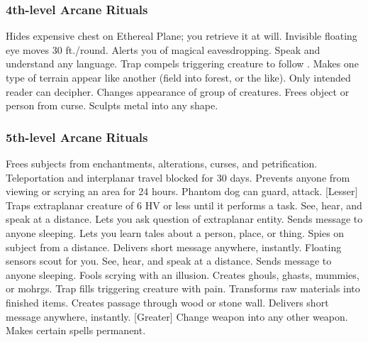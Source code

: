\subsubsection{4th-level Arcane Rituals}
\begin{rituallist}
    \F Hides expensive chest on Ethereal Plane; you retrieve it at will.
     Invisible floating eye moves 30 ft./round.
     Alerts you of magical eavesdropping.
     Speak and understand any language.
     Trap compels triggering creature to follow .
     Makes one type of terrain appear like another (field into forest, or the like).
     Only intended reader can decipher.
     Changes appearance of group of creatures.
     Frees object or person from curse.
     Sculpts metal into any shape.
\end{rituallist}

\subsubsection{5th-level Arcane Rituals}
\begin{rituallist}
     Frees subjects from enchantments, alterations, curses, and petrification.
     Teleportation and interplanar travel blocked for 30 days.
     Prevents anyone from viewing or scrying an area for 24 hours.
     Phantom dog can guard, attack.
    [Lesser] Traps extraplanar creature of 6 HV or less until it performs a task.
     See, hear, and speak at a distance.
     Lets you ask question of extraplanar entity.
     Sends message to anyone sleeping.
    \F Lets you learn tales about a person, place, or thing.
    \F Spies on subject from a distance.
     Delivers short message anywhere, instantly.
     Floating sensors scout for you.
     See, hear, and speak at a distance.
     Sends message to anyone sleeping.
     Fools scrying with an illusion.
     Creates ghouls, ghasts, mummies, or mohrgs.
     Trap fills triggering creature with pain.
     Transforms raw materials into finished items.
     Creates passage through wood or stone wall.
     Delivers short message anywhere, instantly.
    [Greater] Change weapon into any other weapon.
     Makes certain spells permanent.
\end{rituallist}

